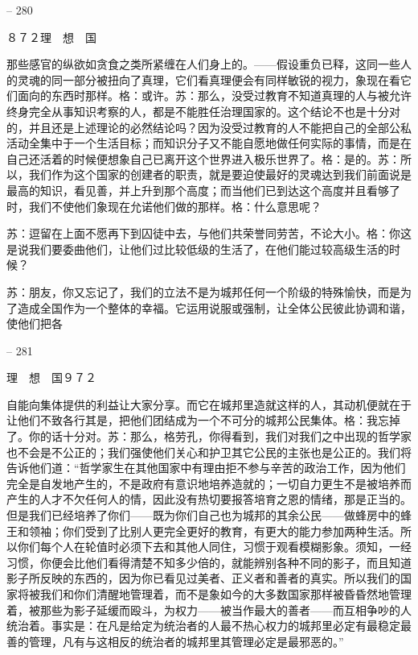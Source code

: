 \documentclass[11pt,oneside]{book}
\begin{document}
\begin{common-format}
    

-- 280

    ８７２理　想　国

    那些感官的纵欲如贪食之类所紧缠在人们身上的。——假设重负已释，这同一些人的灵魂的同一部分被扭向了真理，它们看真理便会有同样敏锐的视力，象现在看它们面向的东西时那样。格：或许。苏：那么，没受过教育不知道真理的人与被允许终身完全从事知识考察的人，都是不能胜任治理国家的。这个结论不也是十分对的，并且还是上述理论的必然结论吗？因为没受过教育的人不能把自己的全部公私活动全集中于一个生活目标；而知识分子又不能自愿地做任何实际的事情，而是在自己还活着的时候便想象自己已离开这个世界进入极乐世界了。格：是的。苏：所以，我们作为这个国家的创建者的职责，就是要迫使最好的灵魂达到我们前面说是最高的知识，看见善，并上升到那个高度；而当他们已到达这个高度并且看够了时，我们不使他们象现在允诺他们做的那样。格：什么意思呢？

    苏：逗留在上面不愿再下到囚徒中去，与他们共荣誉同劳苦，不论大小。格：你这是说我们要委曲他们，让他们过比较低级的生活了，在他们能过较高级生活的时候？

    苏：朋友，你又忘记了，我们的立法不是为城邦任何一个阶级的特殊愉快，而是为了造成全国作为一个整体的幸福。它运用说服或强制，让全体公民彼此协调和谐，使他们把各

    

-- 281

    理　想　国９７２

    自能向集体提供的利益让大家分享。而它在城邦里造就这样的人，其动机便就在于让他们不致各行其是，把他们团结成为一个不可分的城邦公民集体。格：我忘掉了。你的话十分对。苏：那么，格劳孔，你得看到，我们对我们之中出现的哲学家也不会是不公正的；我们强使他们关心和护卫其它公民的主张也是公正的。我们将告诉他们道：“哲学家生在其他国家中有理由拒不参与辛苦的政治工作，因为他们完全是自发地产生的，不是政府有意识地培养造就的；一切自力更生不是被培养而产生的人才不欠任何人的情，因此没有热切要报答培育之恩的情绪，那是正当的。但是我们已经培养了你们——既为你们自己也为城邦的其余公民——做蜂房中的蜂王和领袖；你们受到了比别人更完全更好的教育，有更大的能力参加两种生活。所以你们每个人在轮值时必须下去和其他人同住，习惯于观看模糊影象。须知，一经习惯，你便会比他们看得清楚不知多少倍的，就能辨别各种不同的影子，而且知道影子所反映的东西的，因为你已看见过美者、正义者和善者的真实。所以我们的国家将被我们和你们清醒地管理着，而不是象如今的大多数国家那样被昏昏然地管理着，被那些为影子延缓而殴斗，为权力——被当作最大的善者——而互相争吵的人统治着。事实是：在凡是给定为统治者的人最不热心权力的城邦里必定有最稳定最善的管理，凡有与这相反的统治者的城邦里其管理必定是最邪恶的。”


\end{common-format}
\end{document}
